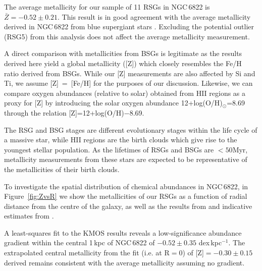 \documentclass[iop]{emulateapj}
\begin{document}
The average metallicity for our sample of 11 RSGs in NGC\,6822 is
$\bar{Z} = -0.52\pm 0.21$.
This result is in good agreement with the average metallicity derived in
NGC\,6822 from blue supergiant stars
\citep[BSGs;][]{1999A&A...352L..40M,2001ApJ...547..765V}.
Excluding the potential outlier (RSG5) from this analysis does not affect the average metallicity measurement.

A direct comparison with metallicities from BSGs is legitimate as the results derived here yield a global metallicity ([Z]) which
closely resembles the Fe/H ratio derived from BSGs.
While our [Z] measurements are also affected by Si and Ti,
we assume [Z]~=~[Fe/H] for the purposes of our discussion.
Likewise, we can compare oxygen abundances (relative to solar) obtained from HII regions as a proxy for [Z] by
introducing the solar oxygen abundance
{12+log(O/H)}$_{\odot}$=8.69
\citep{2009ARA&A..47..481A} through the relation
[Z]=12+log(O/H)$-$8.69.

The RSG and BSG stages are different evolutionary stages within the life cycle of a massive star,
while HII regions are the birth clouds which give rise to the youngest stellar population.
As the lifetimes of RSGs and BSGs are $<50$Myr,
metallicity measurements from these stars are expected to be representative of the metallicities of their birth clouds.

To investigate the spatial distribution of chemical abundances in NGC\,6822,
in Figure~\ref{fig:ZvsR}
we show the metallicities of our RSGs as a function of radial distance from the centre of the galaxy,
as well as the results from
\cite{2001ApJ...547..765V} and indicative estimates from
\cite{1999A&A...352L..40M}.

A least-squares fit to the KMOS results reveals a low-significance abundance gradient within the central 1\,kpc of NGC\,6822 of $-0.52\pm0.35$ dex\,kpc$^{-1}$.
The extrapolated central metallicity from the fit (i.e. at R$=$0) of [Z]$=-0.30\pm0.15$ derived remains consistent with the average metallicity assuming no gradient.
\end{document}
